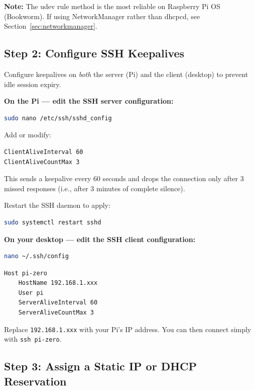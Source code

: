 \documentclass[11pt,letter]{article}
\begin{document}
\begin{notebox}
\textbf{Note:} The udev rule method is the most reliable on Raspberry Pi OS (Bookworm). If using NetworkManager rather than dhcpcd, see Section~\ref{sec:networkmanager}.
\end{notebox}

\subsection{Step 2: Configure SSH Keepalives}

Configure keepalives on \emph{both} the server (Pi) and the client (desktop) to prevent idle session expiry.

\textbf{On the Pi --- edit the SSH server configuration:}
\begin{lstlisting}[language=bash, caption={Edit SSH server config on the Pi}]
sudo nano /etc/ssh/sshd_config
\end{lstlisting}

Add or modify:
\begin{lstlisting}[caption={SSH server keepalive settings}]
ClientAliveInterval 60
ClientAliveCountMax 3
\end{lstlisting}

This sends a keepalive every 60 seconds and drops the connection only after 3 missed responses (i.e., after 3 minutes of complete silence).

Restart the SSH daemon to apply:
\begin{lstlisting}[language=bash]
sudo systemctl restart sshd
\end{lstlisting}

\textbf{On your desktop --- edit the SSH client configuration:}
\begin{lstlisting}[language=bash, caption={Edit SSH client config on desktop}]
nano ~/.ssh/config
\end{lstlisting}
\begin{lstlisting}[caption={SSH client keepalive settings}]
Host pi-zero
    HostName 192.168.1.xxx
    User pi
    ServerAliveInterval 60
    ServerAliveCountMax 3
\end{lstlisting}

Replace \texttt{192.168.1.xxx} with your Pi's IP address. You can then connect simply with \texttt{ssh pi-zero}.

\subsection{Step 3: Assign a Static IP or DHCP Reservation}
\end{document}
